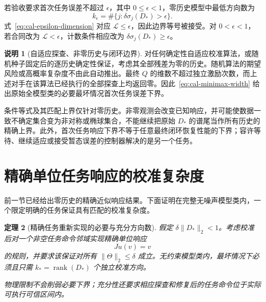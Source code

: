 \documentclass[11pt,a4paper]{article}
\numberwithin{equation}{section}
\newtheorem{theorem}{定理}[section]
\theoremstyle{definition}
\newtheorem{remark}[theorem]{说明}
\begin{document}
若验收要求首次任务误差不超过 $\epsilon$，其中 $0\le\epsilon<1$，零历史模型中最低方向数为
\begin{equation}
  k_\epsilon=
  \#\{j:\delta\sigma_j(D_*)>\epsilon\}.
  \label{eq:cal-epsilon-dimension}
\end{equation}
式~\eqref{eq:cal-epsilon-dimension} 对应 $\mathcal L\le\epsilon$，因此边界等号被接受。对 $0<\epsilon<1$，若合同改为 $\mathcal L<\epsilon$，计数条件相应改为 $\delta\sigma_j(D_*)\ge\epsilon$。

\begin{remark}[自适应探查、非零历史与闭环边界]
\label{rem:cal-width-scope}
对任何确定性自适应校准算法，或随机种子固定后的逐历史确定性保证，考虑其全部残差为零的历史。随机算法的期望风险或高概率复杂度不由此自动推出。最终 $Q$ 的维数不超过独立激励次数，而上述对手在该算法已经执行的全部探查上均返回零。因此~\eqref{eq:cal-minimax-width} 给出原始全模型类的必要最坏情况首次任务误差下界。

条件等式及其匹配上界仅针对零历史。非零观测会改变已知响应，并可能使数据一致不确定集合变为非对称或椭球集合，不能继续把原始 $D_*$ 的谱尾当作所有历史的精确上界。此外，首次任务响应下界不等于任意最终闭环恢复性能的下界；容许等待、继续适应或接受暂态误差的控制器解决的是另一个任务。
\end{remark}





\section{精确单位任务响应的校准复杂度}
\label{sec:cal-exact-complexity}

前一节已经给出零历史的精确近似响应结果。下面证明在完整无噪声模型类内，一个限定明确的任务保证具有匹配的校准复杂度。

\begin{theorem}[精确任务重新实现的必要与充分方向数]
\label{thm:cal-exact-task}
假定 $\delta\|D_*\|_2<1$。考虑校准后对一个非空任务命令邻域实现精确单位响应
\begin{equation}
  Ju(v)=v
  \label{eq:cal-unit-task}
\end{equation}
的规则，并要求该保证对所有 $\|\Theta\|_2\le\delta$ 成立。无约束模型类内，最坏情况下必须且只需 $k_*=\operatorname{rank}(D_*)$ 个独立校准方向。

物理限制不会削弱必要下界；充分性还要求相应探查和修复后的任务命令位于实际可执行可信区间内。
\end{theorem}
\end{document}
